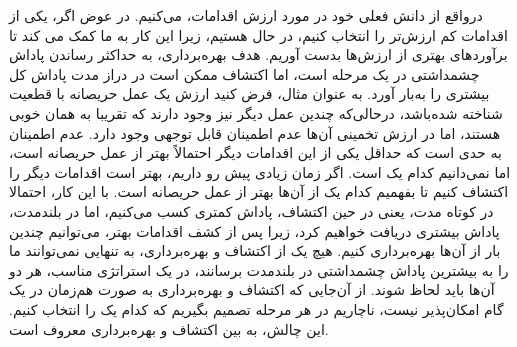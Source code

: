درواقع از دانش فعلی خود در مورد ارزش اقدامات،  می‌کنیم. در عوض اگر،
یکی از اقدامات کم ارزش‌تر را انتخاب کنیم، در حال  هستیم، زیرا این کار به ما کمک می ‌کند تا برآوردهای بهتری از ارزش‌ها بدست آوریم. هدف بهره‌برداری، به حداکثر رساندن پاداش چشمداشتی در یک مرحله است، اما اکتشاف ممکن است در دراز مدت پاداش کل بیشتری را به‌بار‌ آورد.
به عنوان مثال، فرض کنید ارزش یک عمل حریصانه با قطعیت شناخته شده‌باشد، در‌حالی‌‌که چندین عمل دیگر نیز وجود دارند که
تقریبا به همان خوبی  هستند، اما در ارزش تخمینی آن‌ها عدم اطمینان قابل توجهی  وجود دارد. عدم اطمینان به حدی است که حداقل
یکی از این اقدامات دیگر احتمالاً بهتر از عمل حریصانه است، اما نمی‌دانیم کدام یک است.
اگر زمان زیادی پیش رو داریم، بهتر است
اقدامات دیگر را اکتشاف کنیم تا بفهمیم کدام یک از آن‌ها بهتر از عمل حریصانه است. با این کار، احتمالا در کوتاه مدت، یعنی در حین اکتشاف، پاداش کمتری کسب می‌کنیم، اما در بلندمدت، پاداش بیشتری دریافت خواهیم کرد، زیرا پس از کشف اقدامات بهتر، می‌توانیم چندین بار از آن‌ها بهره‌برداری کنیم. 
هیچ یک از اکتشاف و بهره‌برداری، به تنهایی نمی‌توانند ما را به بیشترین پاداش چشمداشتی در بلندمدت برسانند، در یک استراتژی مناسب، هر دو آن‌ها باید لحاظ شوند. از آن‌جایی که اکتشاف و بهره‌برداری به صورت هم‌زمان در یک گام امکان‌پذیر نیست، ناچاریم در هر مرحله تصمیم بگیریم که کدام یک را انتخاب کنیم. این چالش، به  بین اکتشاف و بهره‌برداری معروف است.



